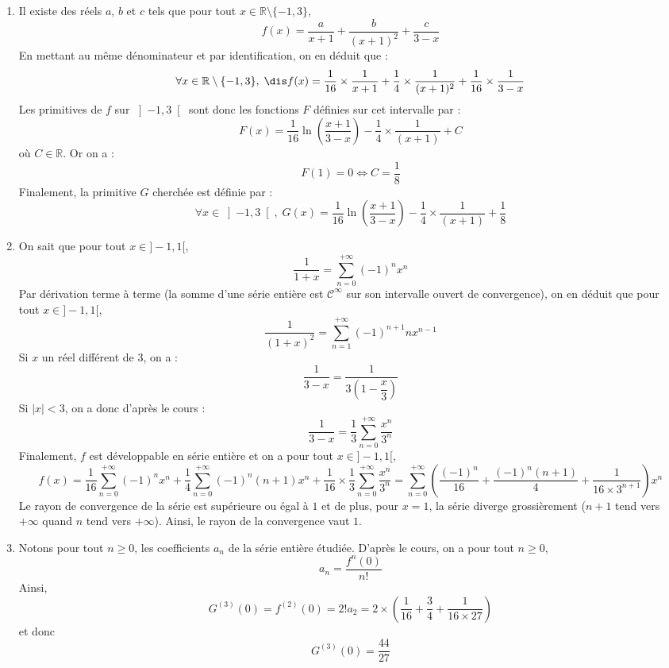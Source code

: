 \documentclass[a4paper,10pt]{report}
\begin{document}
\corr \begin{enumerate}
\item Il existe des réels $a$, $b$ et $c$ tels que pour tout $x \in \mathbb{R} \setminus \lbrace -1,3 \rbrace$,
$$ f(x) = \dfrac{a}{x+1} + \dfrac{b}{(x+1)^2} +  \dfrac{c}{3-x}$$
En mettant au même dénominateur et par identification, on en déduit que :
$$ \forall x \in \mathbb{R} \setminus \lbrace -1,3 \rbrace , \; \dis f(x)=\dfrac{1}{16}\times\dfrac{1}{x+1}+\dfrac{1}{4}\times\dfrac{1}{(x+1)^2}+\dfrac{1}{16}\times\dfrac{1}{3-x}$$
Les primitives de $f$ sur $\left]-1,3\right[$ sont donc les fonctions $F$ définies sur cet intervalle par :
$$F(x)=\dfrac{1}{16}\ln \left( \dfrac{x+1}{3-x}\right) -\dfrac{1}{4}\times\dfrac{1}{(x+1)}+C$$
où $C\in\mathbb{R}$. Or on a :
$$F(1)=0\Longleftrightarrow C=\dfrac{1}{8}$$
Finalement, la primitive $G$ cherchée est définie par :
$$ \forall x\in \left]-1,3 \right[ , \; G(x)= \dfrac{1}{16}\ln \left( \dfrac{x+1}{3-x}\right) -\dfrac{1}{4}\times\dfrac{1}{(x+1)}+\dfrac{1}{8}$$
\item On sait que pour tout $x \in ]-1,1[$,
$$\dfrac{1}{1+x}=\sum\limits_{n=0}^{+\infty}(-1)^{n}x^n$$
Par dérivation terme à terme (la somme d'une série entière est $\mathcal{C}^{\infty}$ sur son intervalle ouvert de convergence), on en déduit que pour tout $x \in ]-1,1[$,
$$\dfrac{1}{(1+x)^2}=\sum\limits_{n=1}^{+\infty}(-1)^{n+1}nx^{n-1}$$
Si $x$ un réel différent de $3$, on a :
$$\dfrac{1}{3-x}=\dfrac{1} {3\left( 1-\dfrac{x}{3}\right) }$$
Si $\vert x \vert <3$, on a donc d'après le cours :
$$\dfrac{1}{3-x}=\dfrac{1}{3}\sum\limits_{n=0}^{+\infty}\dfrac{x^n}{3^n}$$
Finalement, $f$ est développable en série entière et on a pour tout $x \in ]-1,1[$,
$$ f(x) = \dfrac{1}{16} \sum\limits_{n=0}^{+\infty}(-1)^{n}x^n
+\dfrac{1}{4}\sum\limits_{n=0}^{+\infty}(-1)^{n}(n+1)x^{n}+\dfrac{1}{16}\times \dfrac{1}{3}\displaystyle\sum\limits_{n=0}^{+\infty}\dfrac{x^n}{3^n} = \displaystyle\sum\limits_{n=0}^{+\infty}\left(\dfrac{(-1)^n}{16}+\dfrac{(-1)^n(n+1)}{4}+\dfrac{1}{16\times3^{n+1}} \right) x^n$$
Le rayon de convergence de la série est supérieure ou égal à $1$ et de plus, pour $x=1$, la série diverge grossièrement ($n+1$ tend vers $+ \infty$ quand $n$ tend vers $+ \infty$). Ainsi, le rayon de la convergence vaut $1$.
\item Notons pour tout $n \geq 0$, les coefficients $a_n$ de la série entière étudiée.  D'après le cours, on a pour tout $n \geq 0$,
$$ a_n = \dfrac{f^n(0)}{n!}$$
Ainsi,
$$G^{(3)}(0)=f^{(2)}(0)=2!a_2=2\times\left(\dfrac{1}{16} +\dfrac{3}{4}+\dfrac{1}{16\times 27}\right)$$
et donc
$$ G^{(3)}(0)=\dfrac{44}{27}$$
\end{enumerate}
\end{document}
